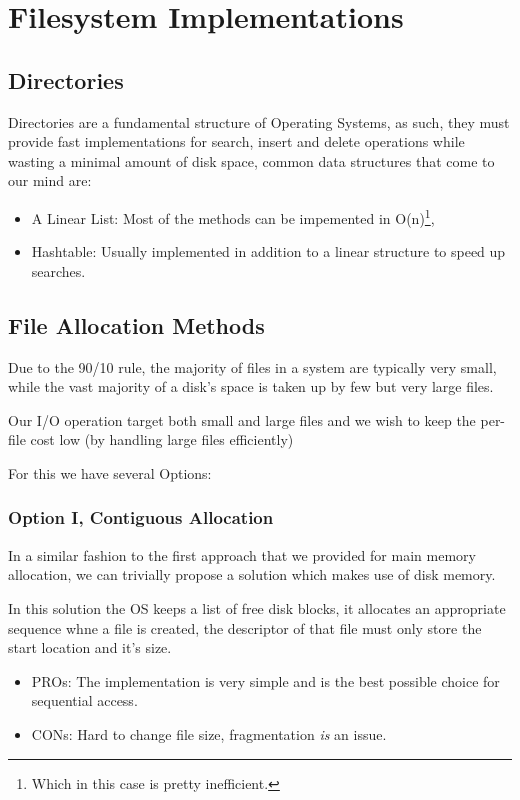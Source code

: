\documentclass[openright, twoside]{report}
\theoremstyle{definition}
\theoremstyle{example}
\begin{document}
\section{Filesystem Implementations}

\subsection{Directories}
Directories are a fundamental structure of Operating Systems, as such, they 
must provide fast implementations for search, insert and delete operations while 
wasting a minimal amount of disk space, common data structures that come to our mind are:

\begin{itemize}
	\item A Linear List: Most of the methods can be impemented in O(n)\footnote{Which in this case 
	is pretty inefficient.}, 
	\item Hashtable: Usually implemented in addition to a linear structure to speed up searches. 
\end{itemize}

\subsection{File Allocation Methods}
Due to the 90/10 rule, the majority of files in a system are typically very small, while 
the vast majority of a disk's space is taken up by few but very large files.

Our I/O operation target both small and large files and we wish to keep 
the per-file cost low (by handling large files efficiently)

For this we have several Options:
\subsubsection{Option I, Contiguous Allocation}
In a similar fashion to the first approach that we provided for main memory allocation, 
we can trivially propose a solution which makes use of disk memory.

In this solution the OS keeps a list of free disk blocks, it allocates an appropriate 
sequence whne a file is created, the descriptor of that file must only store the start
location and it's size.

\begin{itemize}
	\item PROs: The implementation is very simple and is the best possible choice for 
	sequential access.
	\item CONs: Hard to change file size, fragmentation \emph{is} an issue.
\end{itemize}
\end{document}
